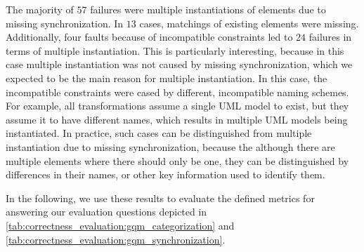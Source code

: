 The majority of $57$ failures were multiple instantiations of elements due to missing synchronization. In $13$ cases, matchings of existing elements were missing.
Additionally, four faults because of incompatible constraints led to $24$ failures in terms of multiple instantiation.
This is particularly interesting, because in this case multiple instantiation was not caused by missing synchronization, which we expected to be the main reason for multiple instantiation.
In this case, the incompatible constraints were cased by different, incompatible naming schemes.
For example, all transformations assume a single \gls{UML} model to exist, but they assume it to have different names, which results in multiple \gls{UML} models being instantiated.
In practice, such cases can be distinguished from multiple instantiation due to missing synchronization, because the although there are multiple elements where there should only be one, they can be distinguished by differences in their names, or other key information used to identify them.

In the following, we use these results to evaluate the defined metrics for answering our evaluation questions depicted in \autoref{tab:correctness_evaluation:gqm_categorization} and \autoref{tab:correctness_evaluation:gqm_synchronization}.





